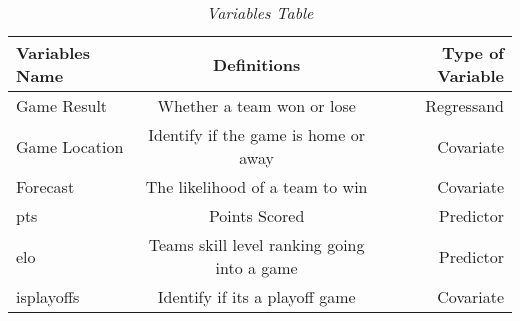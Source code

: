 \documentclass[12pt,english]{article}
\begin{document}
\begin{table}[htbp!]
    \begin{center}
        \begin{tabular}{|l|c|r|}
            \toprule
            Variables Name & Definitions & Type of Variable\\
            \midrule
            Game Result    & Whether a team won or lose & Regressand \\
            Game Location  & Identify if the game is home or away & Covariate \\
            Forecast       & The likelihood of a team to win & Covariate \\
            pts            & Points Scored & Predictor \\
            elo          & Teams skill level ranking going into a game  & Predictor \\
            isplayoffs    & Identify if its a playoff game & Covariate\\ 
            \bottomrule
        \end{tabular}
        \caption{\textit{Variables Table}}
    \end{center}
\end{table}
\end{document}
